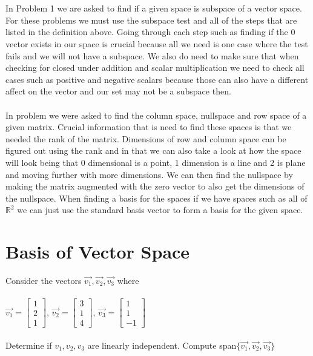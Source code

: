 \documentclass[12pt]{article}
\begin{document}
 \\\\
In Problem 1 we are asked to find if a given space is subspace of a vector space. For these problems we must use the subspace test and all of the steps that are listed in the definition above. Going through each step such as finding if the 0 vector exists in our space is crucial because all we need is one case where the test fails and we will not have a subspace. We also do need to make sure that when checking for closed under addition and scalar multiplication we need to check all cases such as positive and negative scalars because those can also have a different affect on the vector and our set may not be a subspace then.
\\\\In problem we were asked to find the column space, nullspace and row space of a given matrix. Crucial information that is need to find these spaces is that we needed the rank of the matrix. Dimensions of row and column space can be figured out using the rank and in that we can also take a look at how the space will look being that 0 dimensional is a point, 1 dimension is a line and 2 is plane and moving further with more dimensions. We can then find the nullspace by making the matrix augmented with the zero vector to also get the dimensions of the nullspace. When finding a basis for the spaces if we have spaces such as all of $\mathbb{R}^2$ we can just use the standard basis vector to form a basis for the given space.
\newpage
\section{Basis of Vector Space}
Consider the vectors $\vec{v_1}, \vec{v_2}, \vec{v_3}$ where \\\\
$\vec{v_1} = \begin{bmatrix} 1 \\ 2 \\ 1\end{bmatrix}$,
$\vec{v_2} = \begin{bmatrix} 3 \\ 1 \\ 4\end{bmatrix}$,
$\vec{v_3} = \begin{bmatrix} 1 \\ 1 \\ -1\end{bmatrix}$
\\\\Determine if  $v_1, v_2, v_3$ are linearly independent. Compute span$\{\vec{v_1}, \vec{v_2}, \vec{v_3}\}$
\end{document}
